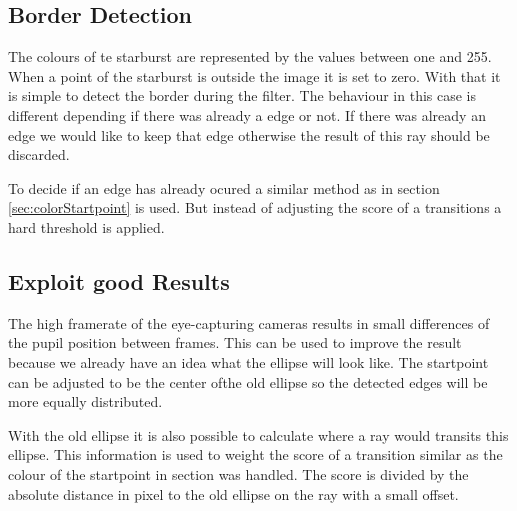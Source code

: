 \subsection{Border Detection}
\label{sec:randdetektion}
The colours of te starburst are represented by the values between one and 255. When a point of the starburst is outside the image it is set to zero. With that it is simple to detect the border during the filter. The behaviour in this case is different depending if there was already a edge or not. If there was already an edge we would like to keep that edge otherwise the result of this ray should be discarded. 

To decide if an edge has already ocured a similar method as in section \ref{sec:colorStartpoint} is used. But instead of adjusting the score of a transitions a hard threshold is applied. 
\subsection{Exploit good Results}
\label{sec:goodResults}

The high framerate of the eye-capturing cameras results in small differences of the pupil position between frames. This can be used to improve the result because we already have an idea what the ellipse will look like. The startpoint can be adjusted to be the center ofthe old ellipse so the detected edges will be more equally distributed.

With the old ellipse it is also possible to calculate where a ray would transits this ellipse. This information is used to weight the score of a transition similar as the colour of the startpoint in section \label{sec:colorStartpoint} was handled. The score is divided by the absolute distance in pixel to the old ellipse on the ray with a small offset.
